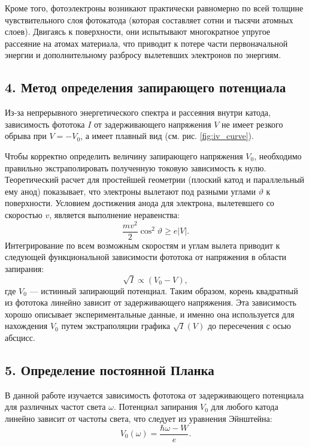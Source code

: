 \documentclass[12pt, a4paper]{article}
\begin{document}
Кроме того, фотоэлектроны возникают практически равномерно по всей толщине чувствительного слоя фотокатода (которая составляет сотни и тысячи атомных слоев). Двигаясь к поверхности, они испытывают многократное упругое рассеяние на атомах материала, что приводит к потере части первоначальной энергии и дополнительному разбросу вылетевших электронов по энергиям.

\subsection*{4. Метод определения запирающего потенциала}
Из-за непрерывного энергетического спектра и рассеяния внутри катода, зависимость фототока $I$ от задерживающего напряжения $V$ не имеет резкого обрыва при $V = -V_0$, а имеет плавный вид (см. рис. \ref{fig:iv_curve}). 

Чтобы корректно определить величину запирающего напряжения $V_0$, необходимо правильно экстраполировать полученную токовую зависимость к нулю. Теоретический расчет для простейшей геометрии (плоский катод и параллельный ему анод) показывает, что электроны вылетают под разными углами $\vartheta$ к поверхности. Условием достижения анода для электрона, вылетевшего со скоростью $v$, является выполнение неравенства:
\begin{equation}
    \frac{mv^2}{2}\cos^2\vartheta \ge e|V|.
\end{equation}
Интегрирование по всем возможным скоростям и углам вылета приводит к следующей функциональной зависимости фототока от напряжения в области запирания:
\begin{equation}
    \sqrt{I} \propto (V_0 - V),
\end{equation}
где $V_0$ --- истинный запирающий потенциал. Таким образом, корень квадратный из фототока линейно зависит от задерживающего напряжения. Эта зависимость хорошо описывает экспериментальные данные, и именно она используется для нахождения $V_0$ путем экстраполяции графика $\sqrt{I}(V)$ до пересечения с осью абсцисс.

\subsection*{5. Определение постоянной Планка}
В данной работе изучается зависимость фототока от задерживающего потенциала для различных частот света $\omega$. Потенциал запирания $V_0$ для любого катода линейно зависит от частоты света, что следует из уравнения Эйнштейна:
\begin{equation}
    V_0(\omega) = \frac{\hbar\omega - W}{e}.
\end{equation}
\end{document}
